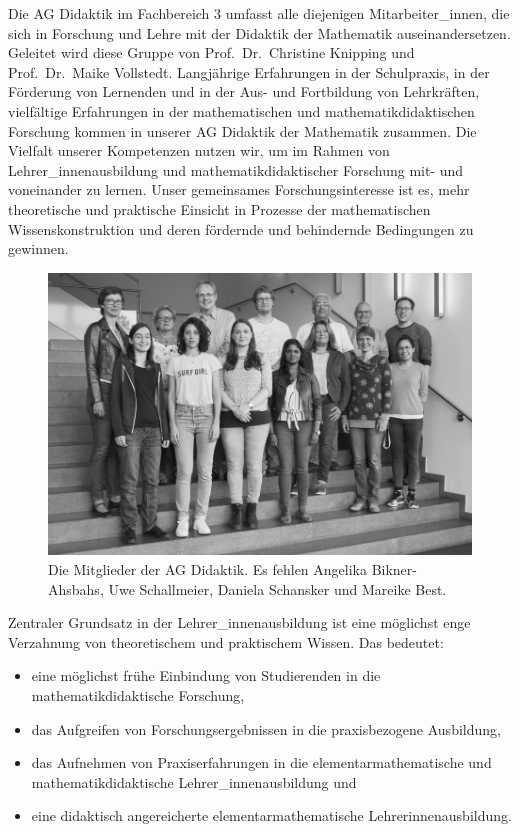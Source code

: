 \documentclass[ngerman,bibliography=totoc,oneside,12pt,a4paper]{scrbook}
\begin{document}
Die AG Didaktik im Fachbereich 3 umfasst alle diejenigen
Mitarbeiter\_innen, die sich in Forschung und Lehre mit der Didaktik der
Mathematik auseinandersetzen. Geleitet wird diese Gruppe von
Prof.~Dr.~Christine Knipping und Prof.~Dr.~Maike Vollstedt. Langjährige
Erfahrungen in der Schulpraxis, in der Förderung von Lernenden und in
der Aus- und Fortbildung von Lehrkräften, vielfältige Erfahrungen in der
mathematischen und mathematikdidaktischen Forschung kommen in unserer AG
Didaktik der Mathematik zusammen. Die Vielfalt unserer Kompetenzen
nutzen wir, um im Rahmen von Lehrer\_innenausbildung und
mathematikdidaktischer Forschung mit- und voneinander zu lernen. Unser
gemeinsames Forschungsinteresse ist es, mehr theoretische und praktische
Einsicht in Prozesse der mathematischen Wissenskonstruktion und deren
fördernde und behindernde Bedingungen zu gewinnen.

\begin{figure}
\centering
\includegraphics{ag_web_bw.jpg}
\caption{\label{fig:ID}Die Mitglieder der AG Didaktik. Es fehlen Angelika
Bikner-Ahsbahs, Uwe Schallmeier, Daniela Schansker und Mareike Best.}
\end{figure}

Zentraler Grundsatz in der Lehrer\_innenausbildung ist eine möglichst
enge Verzahnung von theoretischem und praktischem Wissen. Das bedeutet:

\begin{itemize}
\item
  eine möglichst frühe Einbindung von Studierenden in die
  mathematikdidaktische Forschung,
\item
  das Aufgreifen von Forschungsergebnissen in die praxisbezogene
  Ausbildung,
\item
  das Aufnehmen von Praxiserfahrungen in die elementarmathematische und
  mathematikdidaktische Lehrer\_innenausbildung und
\item
  eine didaktisch angereicherte elementarmathematische
  Lehrerinnenausbildung.
\end{itemize}
\end{document}
